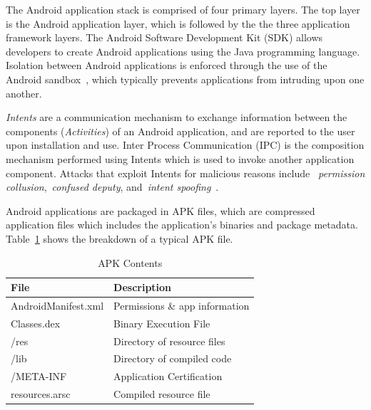 \documentclass[conference]{IEEEtran}
\begin{document}
The Android application stack is comprised of four primary layers. The top layer is the Android application layer, which is followed by the the three application framework layers. The Android Software Development Kit (SDK) allows developers to create Android applications using the Java programming language. Isolation between Android applications is enforced through the use of the Android sandbox~\cite{androidsecuritytips_url}, which typically prevents applications from intruding upon one another.

\emph{Intents} are a communication mechanism to exchange information between the components (\emph{Activities}) of an Android application, and are reported to the user upon installation and use. Inter Process Communication (IPC) is the composition mechanism performed using Intents which is used to invoke another application component. Attacks that exploit Intents for malicious reasons include ~\emph{permission collusion},~\emph{confused deputy}, and~\emph{intent spoofing}~\cite{Chin:2011:AIC:1999995.2000018,grace2012systematic, Marforio:2012:ACC:2420950.2420958, 6641043}.

Android applications are packaged in APK files, which are compressed application files which includes the application's binaries and package metadata. Table~\ref{Table:apkcontents} shows the breakdown of a typical APK file.



\begin{table}[ht]%
\begin{center}
\caption{APK Contents}
\label{Table:apkcontents}
  \begin{tabular}{| l | l | } \hline

    \bfseries File & \bfseries Description \\ \hline
    AndroidManifest.xml & Permissions \& app information \\ \hline
    Classes.dex & Binary Execution File \\ \hline
    /res & Directory of resource files \\ \hline
    /lib & Directory of compiled code \\ \hline
    /META-INF & Application Certification \\ \hline
    resources.arsc & Compiled resource file \\ \hline
  \end{tabular}
  \end{center}
\end{table}
\end{document}

